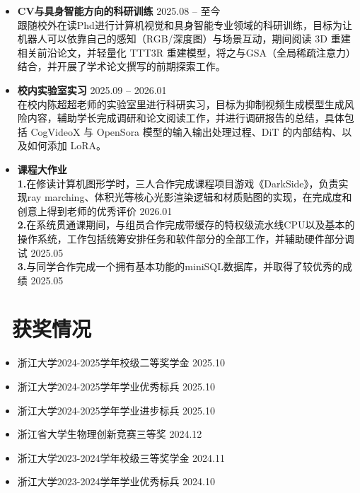 \documentclass[11pt]{article}
\newlength{\intraProjectTitleSep}
\newcommand{\titlebreak}{\\[\intraProjectTitleSep]}
\newlength{\intraProjectListTopSep}
\begin{document}
\begin{itemize}[nosep, topsep=\intraProjectListTopSep]
    \item  \textbf{CV与具身智能方向的科研训练} \hfill 2025.08 -- 至今 \titlebreak
    跟随校外在读Phd进行计算机视觉和具身智能专业领域的科研训练，目标为让机器人可以依靠自己的感知（RGB/深度图）与场景互动，期间阅读 3D 重建相关前沿论文，并轻量化 TTT3R 重建模型，将之与GSA（全局稀疏注意力）结合，并开展了学术论文撰写的前期探索工作。  
    \item \textbf{校内实验室实习} \hfill 2025.09 -- 2026.01 \titlebreak
    在校内陈超超老师的实验室里进行科研实习，目标为抑制视频生成模型生成风险内容，辅助学长完成调研和论文阅读工作，并进行调研报告的总结，具体包括 CogVideoX 与 OpenSora 模型的输入输出处理过程、DiT 的内部结构、以及如何添加 LoRA。
    \item \textbf{课程大作业} \titlebreak
    \textbf{1.}在修读计算机图形学时，三人合作完成课程项目游戏《DarkSide》，负责实现ray marching、体积光等核心光影渲染逻辑和材质贴图的实现，在完成度和创意上得到老师的优秀评价 \hfill 2026.01 \\
    \textbf{2.}在系统贯通课期间，与组员合作完成带缓存的特权级流水线CPU以及基本的操作系统，工作包括统筹安排任务和软件部分的全部工作，并辅助硬件部分调试 \hfill 2025.05 \\
    \textbf{3.}与同学合作完成一个拥有基本功能的miniSQL数据库，并取得了较优秀的成绩 \hfill 2025.05
\end{itemize}



\section{\makebox[\widthof{\faGraduationCap}][c]{\color{CVBlue}\faList}\ 获奖情况}
\begin{itemize}
    \item 浙江大学2024-2025学年校级二等奖学金 \hfill 2025.10
    \item 浙江大学2024-2025学年学业优秀标兵 \hfill 2025.10
    \item 浙江大学2024-2025学年学业进步标兵 \hfill 2025.10
    \item 浙江省大学生物理创新竞赛三等奖  \hfill 2024.12
    \item 浙江大学2023-2024学年校级三等奖学金 \hfill 2024.11
    \item 浙江大学2023-2024学年学业优秀标兵 \hfill 2024.10    
\end{itemize}
\end{document}

